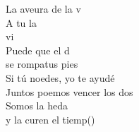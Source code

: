 \begin{cancion}
\begin{chorus}
		La aveura de la v\\
		A tu la\\
		vi \\
		Puede que el d\\
		se rompatus pies \\
		Si tú noedes, yo te ayudé \\
		Juntos poemos vencer los dos\\
		Somos la heda \\
		y la curen el tiemp()\jump\\
	\end{chorus}%
\end{cancion}%

